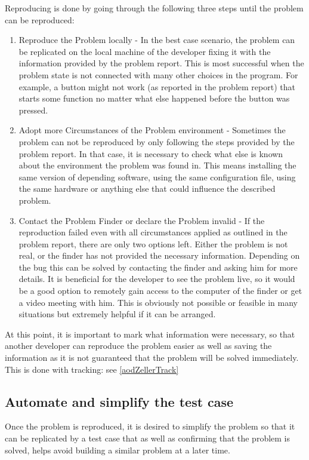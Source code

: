 Reproducing is done by going through the following three steps until the problem can be reproduced:
\begin{enumerate}
  \item Reproduce the Problem locally - In the best case scenario, the problem can be replicated on the local machine of the developer fixing it with the information provided by the problem report. This is most successful when the problem state is not connected with many other choices in the program. For example, a button might not work (as reported in the problem report) that starts some function no matter what else happened before the button was pressed.
  \item Adopt more Circumstances of the Problem environment - Sometimes the problem can not be reproduced by only following the steps provided by the problem report. In that case, it is necessary to check what else is known about the environment the problem was found in. This means installing the same version of depending software, using the same configuration file, using the same hardware or anything else that could influence the described problem.
  \item Contact the Problem Finder or declare the Problem invalid - If the reproduction failed even with all circumstances applied as outlined in the problem report, there are only two options left. Either the problem is not real, or the finder has not provided the necessary information. Depending on the bug this can be solved by contacting the finder and asking him for more details. It is beneficial for the developer to see the problem live, so it would be a good option to remotely gain access to the computer of the finder or get a video meeting with him. This is obviously not possible or feasible in many situations but extremely helpful if it can be arranged.
\end{enumerate}

At this point, it is important to mark what information were necessary, so that another developer can reproduce the problem easier as well as saving the information as it is not guaranteed that the problem will be solved immediately. This is done with tracking: see \ref{aodZellerTrack}

\subsection{Automate and simplify the test case}
Once the problem is reproduced, it is desired to simplify the problem so that it can be replicated by a test case that as well as confirming that the problem is solved, helps avoid building a similar problem at a later time.

